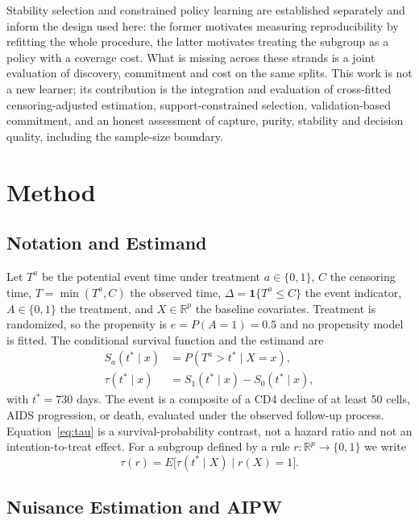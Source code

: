 \documentclass[conference]{IEEEtran}
\newcommand{\tstar}{t^{\ast}}
\begin{document}
Stability selection \cite{stability} and constrained policy learning
\cite{policy} are established separately and inform the design used here: the
former motivates measuring reproducibility by refitting the whole procedure,
the latter motivates treating the subgroup as a policy with a coverage cost.
What is missing across these strands is a joint evaluation of discovery,
commitment and cost on the same splits. This work is not a new learner; its
contribution is the integration and evaluation of cross-fitted
censoring-adjusted estimation, support-constrained selection, validation-based
commitment, and an honest assessment of capture, purity, stability and decision
quality, including the sample-size boundary.

\section{Method}

\subsection{Notation and Estimand}

Let $T^{a}$ be the potential event time under treatment $a\in\{0,1\}$, $C$ the
censoring time, $T=\min(T^{a},C)$ the observed time, $\Delta=\mathbf{1}\{T^{a}\le
C\}$ the event indicator, $A\in\{0,1\}$ the treatment, and $X\in\mathbb{R}^{p}$
the baseline covariates. Treatment is randomized, so the propensity is
$e=P(A=1)=0.5$ and no propensity model is fitted. The conditional survival
function and the estimand are
\begin{align}
S_{a}(\tstar\mid x) &= P(T^{a}>\tstar\mid X=x),\label{eq:S}\\
\tau(\tstar\mid x) &= S_{1}(\tstar\mid x)-S_{0}(\tstar\mid x),\label{eq:tau}
\end{align}
with $\tstar=730$ days. The event is a composite of a CD4 decline of at least
50 cells, AIDS progression, or death, evaluated under the observed follow-up
process. Equation~\eqref{eq:tau} is a survival-probability contrast, not a
hazard ratio and not an intention-to-treat effect. For a subgroup defined by a
rule $r:\mathbb{R}^{p}\to\{0,1\}$ we write
\begin{equation}
\tau(r)=E\big[\tau(\tstar\mid X)\mid r(X)=1\big].\label{eq:taur}
\end{equation}

\subsection{Nuisance Estimation and AIPW}
\end{document}
